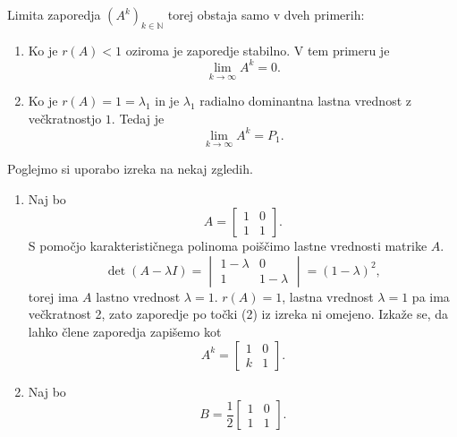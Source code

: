 \documentclass[mat1]{fmfdelo}
\newcommand{\N}{\mathbb N}
\begin{document}
Limita zaporedja $(A^k)_{k\in\N}$ torej obstaja samo v dveh primerih:
\begin{enumerate}
    \item Ko je $r(A) < 1$ oziroma je zaporedje stabilno. V tem primeru je \[\lim_{k\rightarrow\infty} A^k = 0.\]
    \item Ko je $r(A) = 1 = \lambda_1$ in je $\lambda_1$ radialno dominantna lastna vrednost z večkratnostjo $1$. Tedaj je \[\lim_{k\rightarrow\infty} A^k = P_1.\]
\end{enumerate}
Poglejmo si uporabo izreka na nekaj zgledih.
\begin{zgled}\label{zgledAsimptotika}
    \leavevmode
    \begin{enumerate}
        \item Naj bo
        \begin{equation*}
            A =
            \begin{bmatrix}
                1 & 0 \\
                1 & 1
            \end{bmatrix}.
        \end{equation*}
        S pomočjo karakterističnega polinoma poiščimo lastne vrednosti matrike $A$.
        \begin{equation*}
            \det (A - \lambda I) =
            \begin{vmatrix}
                1-\lambda & 0 \\
                1 & 1-\lambda
            \end{vmatrix}
            = (1-\lambda)^2,
        \end{equation*}
        torej ima $A$ lastno vrednost $\lambda=1$. $r(A) = 1$, lastna vrednost $\lambda = 1$ pa ima večkratnost 2, zato zaporedje po točki (2) iz izreka ni omejeno. Izkaže se, da lahko člene zaporedja zapišemo kot
        \begin{equation*}
            A^k =
            \begin{bmatrix}
                1 & 0 \\
                k & 1
            \end{bmatrix}.
        \end{equation*}
        \item Naj bo
        \begin{equation*}
            B = \frac{1}{2}
            \begin{bmatrix}
                1 & 0 \\
                1 & 1
            \end{bmatrix}.

\end{equation*}
\end{enumerate}
\end{zgled}
\end{document}
